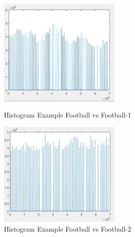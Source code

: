 \documentclass[runningheads,a4paper]{llncs}
\begin{document}
		\begin{figure}[htbp]
		\centering
		\begin{minipage}[t]{0.49\textwidth}
		\centering
		\includegraphics[width=6cm]{footballFootball-1.JPG}
		\caption{Histogram Example Football vs Football-1}
		\label{fig:he-3}
		\end{minipage}
		\begin{minipage}[t]{0.49\textwidth}
		\centering
		\includegraphics[width=6cm]{footballFootball-2.JPG}
		\caption{Histogram Example Football vs Football-2}
		\label{fig:he-4}
		\end{minipage}
		\end{figure}
\end{document}
